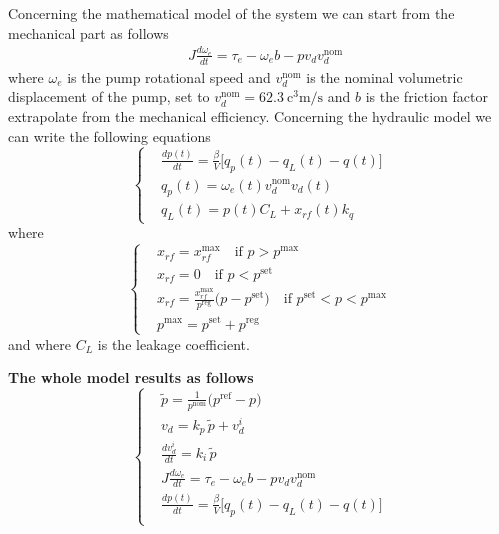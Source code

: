 \documentclass[12pt,a4paper,oneside]{book}
\begin{document}
\begin{onehalfspace}
Concerning the mathematical model of the system we can start from the mechanical part as follows
\begin{equation}
	\begin{aligned}
		&J\frac{d\omega_e}{dt}=\tau_e-\omega_eb - pv_dv_d^{\text{nom}}	
	\end{aligned}
\end{equation}
where $\omega_e$ is the pump rotational speed and $v_d^{\text{nom}}$ is the nominal volumetric displacement of the pump, set to $v_d^{\text{nom}} = \SI{62.3}{\cubic\centi\meter\per\second}$ and $b$ is the friction factor extrapolate from the mechanical efficiency.
Concerning the hydraulic model we can write the following equations
\begin{equation}
	\left\lbrace \begin{aligned}
		&\frac{dp(t)}{dt} = \frac{\beta}{V}\Big[q_p(t)-q_L(t)-q(t)\Big]  \\[6pt]
		&q_p(t) = \omega_e(t)v_d^{\text{nom}} v_d(t) \\[6pt]
		&q_L(t) = p(t)C_L + x_{rf}(t)k_q
	\end{aligned}\right. 
\end{equation}
where
\begin{equation}
	\left\lbrace 
	\begin{aligned}
		&x_{rf} = x_{rf}^{\text{max}}\quad\text{if }p>p^\text{max} \\[6pt]
		&x_{rf} = 0\quad\text{if } p<p^\text{set} \\[6pt]
		&x_{rf} = \frac{x_{rf}^{\text{max}}}{p^\text{reg}}\big(p-p^\text{set}\big)\quad\text{if } p^\text{set}<p<p^\text{max}\\[6pt]
		&p^\text{max} = p^\text{set}+p^\text{reg}
	\end{aligned}\right. 
\end{equation}
and where $C_L$ is the leakage coefficient.
\begin{mybox}
	\textbf{The whole model results as follows}
	\begin{equation}
		\left\lbrace \begin{aligned}
			&\tilde{p} = \frac{1}{p^{\text{nom}}}\Big(p^{\text{ref}} - p\Big)\\[6pt]
			&v_d = k_p\,\tilde{p} + v_d^i \\[6pt]
			&\frac{dv_d^i}{dt} = k_i\,\tilde{p}\\[6pt]	
			&J\frac{d\omega_e}{dt}=\tau_e-\omega_eb - pv_dv_d^{\text{nom}}	 \\[6pt]
			&\frac{dp(t)}{dt} = \frac{\beta}{V}\Big[q_p(t)-q_L(t)-q(t)\Big]  \\[6pt]

\end{aligned}
\end{equation}
\end{mybox}
\end{onehalfspace}
\end{document}

